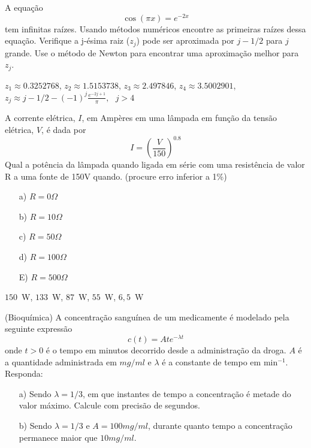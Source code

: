 \begin{Exercise} A equação $$\cos(\pi x)=e^{-2x}$$ tem infinitas raízes.
Usando  métodos numéricos encontre as primeiras raízes dessa equação. Verifique a j-ésima raiz ($z_j$) pode ser aproximada por $j-1/2$ para $j$ grande. Use o método de Newton para encontrar uma aproximação melhor para $z_j$.
\end{Exercise}
\begin{Answer}
  \begin{tiny}
 $z_1\approx 0.3252768 $, $z_2\approx 1.5153738$, $z_3\approx 2.497846  $, $z_4\approx 3.5002901$, $z_j\approx j-1/2-(-1)^j\frac{e^{-2j+1}}{\pi}, ~~~j>4$    
  \end{tiny}
\end{Answer}


\begin{Exercise}[title=Eletricidade]A corrente elétrica, $I$, em Ampères em uma lâmpada em função da tensão elétrica, $V$, é dada por
$$I=\left(\frac{V}{150}\right)^{0.8}$$
Qual a potência da lâmpada quando ligada em série com uma resistência de valor R a uma fonte de 150V quando. (procure erro inferior a 1\%)
\begin{itemize}
\item [a)] $R=0\Omega$
\item [b)] $R=10\Omega$
\item [c)] $R=50\Omega$
\item [d)] $R=100\Omega$
\item [E)] $R=500\Omega$
\end{itemize}
\end{Exercise}
\begin{Answer}
  \begin{tiny}
$150$~W, $133$~W, $87$~W, $55$~W, $6,5$~W    
  \end{tiny}
\end{Answer}




\begin{Exercise} (Bioquímica) A concentração sanguínea de um medicamente é modelado pela seguinte expressão
$$c(t)=Ate^{-\lambda t}$$
onde $t>0$ é o tempo em minutos decorrido desde a administração da droga. $A$ é a quantidade administrada em $mg/ml$ e $\lambda$ é a constante de tempo em min$^{-1}$.
Responda:
\begin{itemize}
\item[a)] Sendo $\lambda=1/3$, em que instantes de tempo a concentração é metade do valor máximo. Calcule com precisão de segundos.
\item[b)] Sendo $\lambda=1/3$ e $A=100mg/ml$, durante quanto tempo a concentração permanece maior que $10mg/ml$.
\end{itemize}
\end{Exercise}

